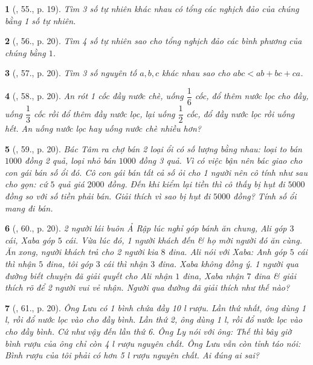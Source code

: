 \documentclass{article}
\newtheorem{baitoan}{}
\begin{document}
\begin{baitoan}[\cite{Binh_Toan_6_tap_2}, 55., p. 19]
	Tìm 3 số tự nhiên khác nhau có tổng các nghịch đảo của chúng bằng 1 số tự nhiên.
\end{baitoan}

\begin{baitoan}[\cite{Binh_Toan_6_tap_2}, 56., p. 20]
	Tìm 4 số tự nhiên sao cho tổng nghịch đảo các bình phương của chúng bằng $1$.
\end{baitoan}

\begin{baitoan}[\cite{Binh_Toan_6_tap_2}, 57., p. 20]
	Tìm 3 số nguyên tố $a,b,c$ khác nhau sao cho $abc < ab + bc + ca$.
\end{baitoan}

\begin{baitoan}[\cite{Binh_Toan_6_tap_2}, 58., p. 20]
	An rót 1 cốc đầy nước chè, uống $\dfrac{1}{6}$ cốc, đổ thêm nước lọc cho đầy, uống $\dfrac{1}{3}$ cốc rồi đổ thêm đầy nước lọc, lại uống $\dfrac{1}{2}$ cốc, đổ đầy nước lọc rồi uống hết. An uống nước lọc hay uống nước chè nhiều hơn?
\end{baitoan}

\begin{baitoan}[\cite{Binh_Toan_6_tap_2}, 59., p. 20]
	Bác Tâm ra chợ bán 2 loại ổi có số lượng bằng nhau: loại to bán $1000$ đồng 2 quả, loại nhỏ bán $1000$ đồng 3 quả. Vì có việc bận nên bác giao cho con gái bán số ổi đó. Cô con gái bán tất cả số ỏi cho 1 người nên cô tính như sau cho gọn: cứ $5$ quả giá $2000$ đồng. Đến khi kiểm lại tiền thì cô thấy bị hụt đi $5000$ đồng so với số tiền phải bán. Giải thích vì sao bị hụt đi $5000$ đồng? Tính số ổi mang đi bán.
\end{baitoan}

\begin{baitoan}[\cite{Binh_Toan_6_tap_2}, 60., p. 20]
	2 người lái buôn Ả Rập lúc nghỉ góp bánh ăn chung, Ali góp $3$ cái, Xaba góp $5$ cái. Vừa lúc đó, 1 người khách đến \& họ mời người đó ăn cùng. Ăn xong, người khách trả cho 2 người kia $8$ đina. Ali nói với Xaba: Anh góp $5$ cái thì nhận $5$ đina, tôi góp $3$ cái thì nhận $3$ đina. Xaba không đồng ý. 1 người qua đường biết chuyện đã giải quyết cho Ali nhận $1$ đina, Xaba nhận $7$ đina \& giải thích rõ để 2 người vui vẻ nhận. Người qua đường đã giải thích như thế nào?
\end{baitoan}

\begin{baitoan}[\cite{Binh_Toan_6_tap_2}, 61., p. 20]
	Ông Lưu có 1 bình chứa đầy {\rm10 l} rượu. Lần thứ nhất, ông dùng {\rm1 l}, rồi đổ nước lọc vào cho đầy bình. Lần thứ 2, ông dùng {\rm1 l}, rồi đổ nước lọc vào cho đầy bình. Cứ như vậy đến lần thứ 6. Ông Ly nói với ông: Thế thì bây giờ bình rượu của ông chỉ còn {\rm4 l} rượu nguyên chất. Ông Lưu vẫn còn tỉnh táo nói: Bình rượu của tôi phải có hơn {\rm5 l} rượu nguyên chất. Ai đúng ai sai?
\end{baitoan}
\end{document}
